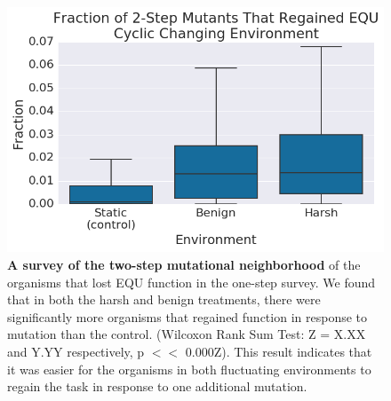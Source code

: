 \documentclass[10pt,letterpaper]{article}
\begin{document}
\begin{figure}[!h] %

\includegraphics[trim={0.2cm 0 0.4cm 0.25cm},clip,width=1\columnwidth]{figures/CCE_frac_2step__box.png}
\caption{{\bf A survey of the two-step mutational neighborhood} of the organisms that lost EQU function in the one-step survey. We found that in both the harsh and benign treatments, there were significantly more organisms that regained function in response to mutation than the control. (Wilcoxon Rank Sum Test: Z = X.XX and Y.YY respectively, p $<<$ 0.000Z). This result indicates that it was easier for the organisms in both fluctuating environments to regain the task in response to one additional mutation.
}\label{fig:CCE_two_step}

\end{figure}
\end{document}
